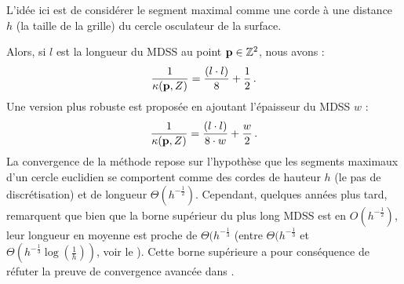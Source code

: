 L'idée ici est de considérer le segment maximal comme une corde à une distance
$h$ (la taille de la grille) du cercle osculateur de la surface.


Alors, si $l$ est la longueur du MDSS au point $\mathbf{p} \in \mathbb{Z}^2$, nous avons :
%
\begin{equation}
    \frac{1}{\kappa(\mathbf{p},Z)} = \frac{(l \cdot l)}{8} + \frac{1}{2} \,.
\end{equation}
%
Une version plus robuste est proposée en ajoutant l'épaisseur du MDSS $w$ :
%
\begin{equation}
    \frac{1}{\kappa(\mathbf{p},Z)} = \frac{(l \cdot l)}{8 \cdot w} + \frac{w}{2} \,.
\end{equation}
%
La convergence de la méthode repose sur l'hypothèse que les segments maximaux
d'un cercle euclidien se comportent comme des cordes de hauteur $h$ (le pas de
discrétisation) et de longueur $\Theta(h^{-\frac{1}{2}})$. Cependant, quelques
années plus tard,  remarquent que
bien que la borne supérieur du plus long MDSS est en $O(h^{-\frac{1}{2}})$, leur
longueur en moyenne est proche de $\Theta(h^{-\frac{1}{3}}$ (entre
$\Theta(h^{-\frac{1}{3}}$ et $\Theta(h^{-\frac{1}{3}} \log
\left(\frac{1}{h}\right))$, voir le ). Cette borne
supérieure a pour conséquence de réfuter la preuve de convergence avancée dans
\cite{Coeurjolly2001}.
%
%


